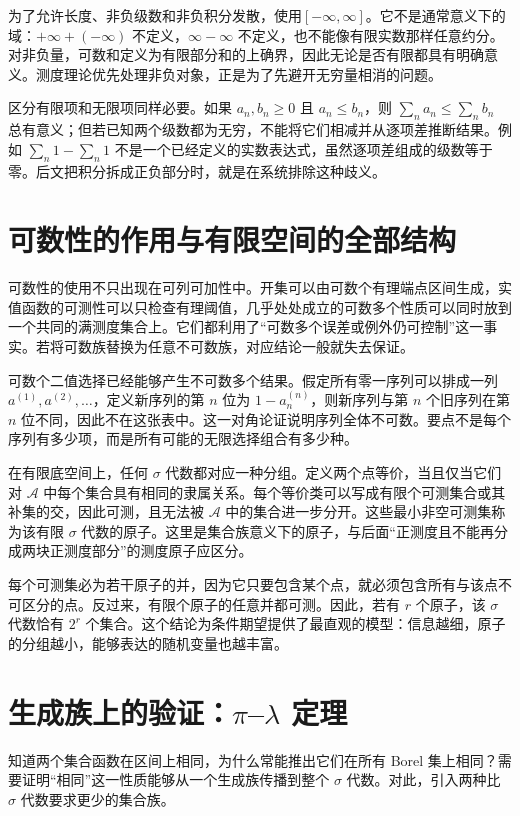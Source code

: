 \documentclass[UTF8,12pt,a4paper,fontset=fandol]{ctexbook}
\begin{document}
为了允许长度、非负级数和非负积分发散，使用$[-\infty,\infty]$。它不是通常意义下的域：$+\infty+(-\infty)$ 不定义，$\infty-\infty$ 不定义，也不能像有限实数那样任意约分。对非负量，可数和定义为有限部分和的上确界，因此无论是否有限都具有明确意义。测度理论优先处理非负对象，正是为了先避开无穷量相消的问题。

区分有限项和无限项同样必要。如果 $a_n,b_n\geq0$ 且 $a_n\leq b_n$，则 $\sum_na_n\leq\sum_nb_n$ 总有意义；但若已知两个级数都为无穷，不能将它们相减并从逐项差推断结果。例如 $\sum_n1-\sum_n1$ 不是一个已经定义的实数表达式，虽然逐项差组成的级数等于零。后文把积分拆成正负部分时，就是在系统排除这种歧义。

\section{可数性的作用与有限空间的全部结构}
可数性的使用不只出现在可列可加性中。开集可以由可数个有理端点区间生成，实值函数的可测性可以只检查有理阈值，几乎处处成立的可数多个性质可以同时放到一个共同的满测度集合上。它们都利用了“可数多个误差或例外仍可控制”这一事实。若将可数族替换为任意不可数族，对应结论一般就失去保证。

可数个二值选择已经能够产生不可数多个结果。假定所有零一序列可以排成一列 $a^{(1)},a^{(2)},\ldots$，定义新序列的第 $n$ 位为 $1-a^{(n)}_n$，则新序列与第 $n$ 个旧序列在第 $n$ 位不同，因此不在这张表中。这一对角论证说明序列全体不可数。要点不是每个序列有多少项，而是所有可能的无限选择组合有多少种。

在有限底空间上，任何 $\sigma$ 代数都对应一种分组。定义两个点等价，当且仅当它们对 $\mathcal A$ 中每个集合具有相同的隶属关系。每个等价类可以写成有限个可测集合或其补集的交，因此可测，且无法被 $\mathcal A$ 中的集合进一步分开。这些最小非空可测集称为该有限 $\sigma$ 代数的原子。这里是集合族意义下的原子，与后面“正测度且不能再分成两块正测度部分”的测度原子应区分。

每个可测集必为若干原子的并，因为它只要包含某个点，就必须包含所有与该点不可区分的点。反过来，有限个原子的任意并都可测。因此，若有 $r$ 个原子，该 $\sigma$ 代数恰有 $2^r$ 个集合。这个结论为条件期望提供了最直观的模型：信息越细，原子的分组越小，能够表达的随机变量也越丰富。

\section{生成族上的验证：$\pi$--$\lambda$ 定理}
\label{sec:mt-pi-lambda}
知道两个集合函数在区间上相同，为什么常能推出它们在所有 Borel 集上相同？需要证明“相同”这一性质能够从一个生成族传播到整个 $\sigma$ 代数。对此，引入两种比 $\sigma$ 代数要求更少的集合族。
\end{document}
